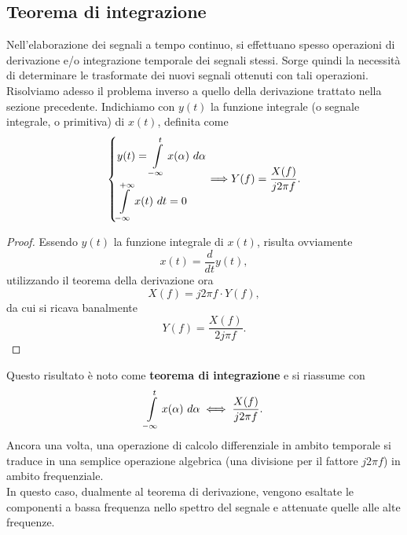 \documentclass[12pt,oneside,openany]{memoir}
\numberwithin{equation}{subsection}
\newcommand{\dt}{\ dt}
\begin{document}
\newpage
\subsection{Teorema di integrazione}
Nell'elaborazione dei segnali a tempo continuo, si effettuano spesso operazioni
di derivazione e/o integrazione temporale dei segnali stessi. Sorge quindi la
necessit\`a di determinare le trasformate dei nuovi segnali ottenuti con tali
operazioni.\\
Risolviamo adesso il problema inverso a quello della derivazione trattato nella
sezione precedente. Indichiamo con $y(t)$ la funzione integrale (o segnale
integrale, o primitiva) di $x(t)$, definita come
\[
    \begin{dcases}
        y(t) = \int\displaylimits_{-\infty}^{t} x(\alpha) \ d \alpha\\
        \int\displaylimits_{-\infty}^{+\infty} x(t) \dt = 0
    \end{dcases}
    \Longrightarrow
    Y(f) = \frac{X(f)}{j 2 \pi f}.
\]
\begin{proof}
Essendo $y(t)$ la funzione integrale di $x(t)$, risulta ovviamente
\[
    x(t) = \frac{d}{dt} y(t),
\]
utilizzando il teorema della derivazione ora
\[
    X(f) = j 2 \pi f \cdot Y(f),
\]
da cui si ricava banalmente
\[
    Y(f) = \frac{X(f)}{2 j \pi f}.
\]
\end{proof}
Questo risultato \`e noto come \textbf{teorema di integrazione} e si riassume
con
\[
    \int\displaylimits_{-\infty}^{t} x(\alpha) \ d \alpha \iff \frac{X(f)
    }{j 2 \pi f}.
\]
Ancora una volta, una operazione di calcolo differenziale in ambito temporale si
traduce in una semplice operazione algebrica (una divisione per il fattore
$j 2 \pi f$) in ambito frequenziale.\\
In questo caso, dualmente al teorema di derivazione, vengono esaltate le
componenti a bassa frequenza nello spettro del segnale e attenuate quelle alle
alte frequenze.


\newpage
\end{document}
